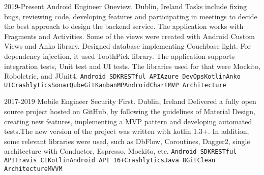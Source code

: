 \documentclass[9pt]{developercv} %
\begin{document}
\newline
\begin{entrylist}
	\entry
		{2019-Present}
		{Android Engineer }
		{Oneview. Dublin, Ireland}
{\newline
Tasks include fixing bugs, reviewing code, developing features and participating in meetings to decide the best approach to design the backend service. The application works with Fragments and Activities. Some of the views were created with Android Custom Views and Anko library. Designed database implementing Couchbase light. For dependency injection, it used ToothPick library. The application supports integration tests, Unit test and UI tests. The libraries used for that were Mockito, Roboletric, and JUnit4.
\newline
\newline
 {\texttt{Android SDK}\slashsep\texttt{RESTful API}\slashsep\texttt{Azure DevOps}\slashsep\texttt{Kotlin}\slashsep\texttt{Anko UI}\slashsep\texttt{Crashlytics}\slashsep\texttt{SonarQube}\slashsep\texttt{Git}\slashsep\texttt{Kanban}\slashsep\texttt{MPAndroidChart}\slashsep\texttt{MVP Architecture}}}

\entry
		{2017-2019}
		{Mobile Engineer}
		{Security First. Dublin, Ireland}
{\newline
Delivered a fully open source project hosted on GitHub, by following the guidelines of Material Design, creating new features, implementing a MVP pattern and developing automated tests.The new version of the project was written with kotlin 1.3+. In addition, some relevant libraries were used, such as DbFlow, Coroutines, Dagger2, single architecture with Conductor, Espresso, Mockito, etc.
\newline
\newline
 {\texttt{Android SDK}\slashsep\texttt{RESTful API}\slashsep\texttt{Travis CI}\slashsep\texttt{Kotlin}\slashsep\texttt{Android API 16+}\slashsep\texttt{Crashlytics}\slashsep\texttt{Java 8}\slashsep\texttt{Git}\slashsep\texttt{Clean Architecture}\slashsep\texttt{MVVM}}}


\end{entrylist}
\end{document}
